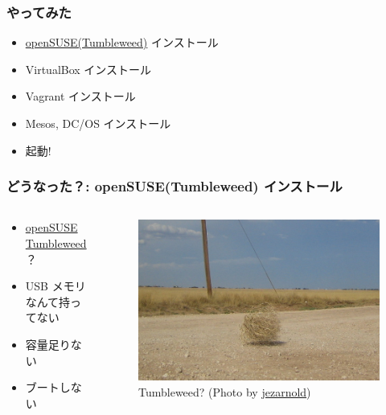 \documentclass[aspectratio=169,11pt,hyperref={colorlinks=true}]{beamer}
\begin{document}
\begin{frame}
  \frametitle{やってみた}
  \begin{itemize}
    \item \href{https://en.opensuse.org/Portal:Tumbleweed}{openSUSE(Tumbleweed)} インストール
    \item VirtualBox インストール
    \item Vagrant インストール
    \item Mesos, DC/OS インストール
    \item 起動!
  \end{itemize}
\end{frame}

\begin{frame}
  \frametitle{どうなった？: openSUSE(Tumbleweed) インストール}
  \begin{columns}[T]
    \begin{column}{.45\textwidth}
      \begin{itemize}
        \item \href{https://www.opensuse.org/}{openSUSE} \href{https://www.opensuse.org/\#Tumbleweed}{Tumbleweed} ？
        \item USB メモリなんて持ってない
        \item 容量足りない
        \item ブートしない
      \end{itemize}
    \end{column}
    \begin{column}{0.28\textwidth}
      \begin{figure}
        \begin{center}
          \caption{Tumbleweed? (Photo by \href{https://www.flickr.com/photos/jezarnold/}{jezarnold})}
          \includegraphics[width=1.0\textwidth]{tumbleweed.jpg}

\end{center}
\end{figure}
\end{column}
\end{columns}
\end{frame}
\end{document}
